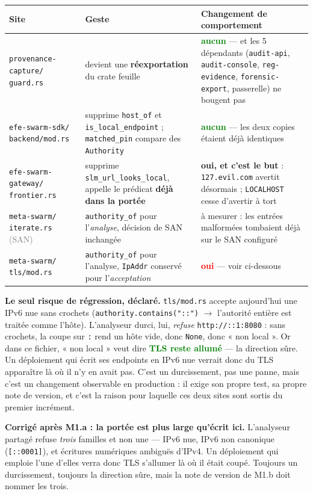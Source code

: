 \documentclass[10pt]{article}
\newcommand{\best}[1]{\textcolor{green}{\textbf{#1}}}
\newcommand{\pire}[1]{\textcolor{red}{\textbf{#1}}}
\newcommand{\sz}[1]{\textcolor{grey}{\small\textsf{#1}}}
\newcommand{\code}[1]{\texttt{\small #1}}
\newcommand{\fl}{$\rightarrow$}
\begin{document}
\begin{center}\footnotesize
\renewcommand{\arraystretch}{1.25}
\begin{tabular}{@{}>{\raggedright\arraybackslash}p{3.6cm} >{\raggedright\arraybackslash}p{6.3cm} >{\raggedright\arraybackslash}p{5.4cm}@{}}
\toprule
\textbf{Site} & \textbf{Geste} & \textbf{Changement de comportement} \\
\midrule
\code{provenance-capture/} \code{guard.rs} &
devient une \textbf{réexportation} du crate feuille &
\best{aucun} --- et les 5 dépendants (\code{audit-api}, \code{audit-console}, \code{reg-evidence}, \code{forensic-export}, passerelle) ne bougent pas \\
\code{efe-swarm-sdk/} \code{backend/mod.rs} &
supprime \code{host\_of} et \code{is\_local\_endpoint} ; \code{matched\_pin} compare des \code{Authority} &
\best{aucun} --- les deux copies étaient déjà identiques \\
\code{efe-swarm-gateway/} \code{frontier.rs} &
supprime \code{slm\_url\_looks\_local}, appelle le prédicat \textbf{déjà dans la portée} &
\textcolor{amber}{\textbf{oui, et c'est le but}} : \code{127.evil.com} avertit désormais ; \code{LOCALHOST} cesse d'avertir à tort \\
\code{meta-swarm/} \code{iterate.rs} \sz{(SAN)} &
\code{authority\_of} pour l'\emph{analyse}, décision de SAN inchangée &
à mesurer : les entrées malformées tombaient déjà sur le SAN configuré \\
\code{meta-swarm/} \code{tls/mod.rs} &
\code{authority\_of} pour l'analyse, \code{IpAddr} conservé pour l'\emph{acceptation} &
\pire{oui} --- voir ci-dessous \\
\bottomrule
\end{tabular}
\end{center}

\begin{alerte}
\textbf{Le seul risque de régression, déclaré.} \code{tls/mod.rs} accepte aujourd'hui une IPv6 nue
sans crochets (\code{authority.contains("::")} \fl{} l'autorité entière est traitée comme l'hôte).
L'analyseur durci, lui, \emph{refuse} \code{http://::1:8080} : sans crochets, la coupe sur \code{:}
rend un hôte vide, donc \code{None}, donc « non local ». Or dans ce fichier, « non local » veut dire
\best{TLS reste allumé} --- la direction sûre. Un déploiement qui écrit ses endpoints en IPv6 nue
verrait donc du TLS apparaître là où il n'y en avait pas. C'est un durcissement, pas une panne, mais
c'est un changement observable en production : il exige son propre test, sa propre note de version,
et c'est la raison pour laquelle ces deux sites sont sortis du premier incrément.

\smallskip
\textbf{Corrigé après M1.a : la portée est plus large qu'écrit ici.} L'analyseur partagé refuse
\emph{trois} familles et non une --- IPv6 nue, IPv6 non canonique (\code{[::0001]}), et écritures
numériques ambiguës d'IPv4. Un déploiement qui emploie l'une d'elles verra donc TLS s'allumer là où
il était coupé. Toujours un durcissement, toujours la direction sûre, mais la note de version de
M1.b doit nommer les trois.
\end{alerte}
\end{document}

